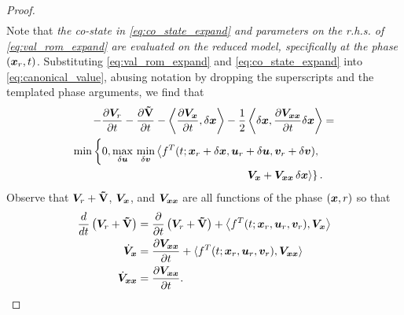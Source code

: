 \begin{proof}
\begin{align}
		\label{eq:co_state_expand}
	\end{align}
	Note that \textit{the co-state in \eqref{eq:co_state_expand} and parameters on the r.h.s. of \eqref{eq:val_rom_expand} are evaluated on the reduced model, specifically at the phase $\left(\bm{x}_r, t\right)$}. Substituting \eqref{eq:val_rom_expand} and \eqref{eq:co_state_expand} into \eqref{eq:canonical_value}, abusing notation by dropping the superscripts and the templated phase arguments, we find that
	\begin{align}
		\begin{split} 
			-\frac{\partial \valuefunc_r}{\partial t} -\frac{\partial \costdiff}{\partial t} - \left\langle \dfrac{\partial\valuefunc_{\state}}{\partial t}, \delta\state \right \rangle -  \dfrac{1}{2} \left\langle \delta \state, \dfrac{\partial \valuefunc_{\state\state} }{\partial t}\delta\state \right \rangle &=  \\
			\min \left\{0,  
			\max_{\delta \control} \, \min_{\delta \disturb} \left\langle f^T(t; \state_r + \delta \state, \control_r + \delta \control,  \disturb_r + \delta \disturb), \right. \right. \\
			\left. \left. \valuefunc_{\state} +  \valuefunc_{\state\state}\, \delta \state \right\rangle \right\}. 
		\end{split}
		\label{eq:ROM_HJI_Proof}
	\end{align}
	Observe that $\bm{V}_r+ \mathbf{\tilde{V}}$, $\bm{V}_{\bm{x}}$, and $\bm{V}_{\bm{x}\bm{x}}$ are all functions of the phase $\left(\bm{x}, r\right)$ so that 
	\begin{subequations}
		\begin{align}
			\frac{d}{dt}\left(\valuefunc_r + \costdiff\right) &= \dfrac{\partial}{\partial t}\left(\valuefunc_r + \costdiff\right) + \left\langle f^T(t; \state_r, \control_r, \disturb_r), \valuefunc_{\state} \right \rangle \\
			\dot{\valuefunc}_{\state} &= \dfrac{\partial \valuefunc_{\state\state}}{\partial t} + \langle f^T(t; \state_r, \control_r, \disturb_r),  \valuefunc_{\state\state} \rangle \\
			\dot{\valuefunc}_{\state\state} &= \dfrac{\partial \valuefunc_{\state\state}}{\partial t}. %
		\end{align}
		\label{eq:reduced_canonical}
	\end{subequations}
\end{proof} 
%

